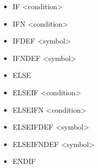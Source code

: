     \begin{itemize}
            \setlength{\itemsep}{-3pt}
            \item IF <condition>
            \item IFN <condition>
            \item IFDEF <symbol>
            \item IFNDEF <symbol>
            \item ELSE
            \item ELSEIF <condition>
            \item ELSEIFN <condition>
            \item ELSEIFDEF <symbol>
            \item ELSEIFNDEF <symbol>
            \item ENDIF
    \end{itemize}


